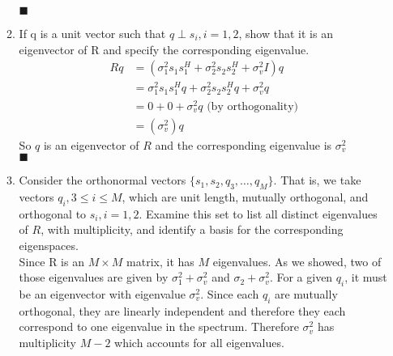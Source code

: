 \documentclass[12pt]{article}
\begin{document}
\begin{enumerate}
\begin{enumerate}
$\blacksquare$
\item If q is a unit vector such that $q \perp s_i, i=1,2$, show that it is an eigenvector of R and specify the corresponding eigenvalue.
\begin{align*}
Rq &= (\sigma_1^2s_1s_1^H + \sigma_2^2s_2s_2^H + \sigma_v^2 I)q\\
&= \sigma_1^2s_1s_1^Hq + \sigma_2^2s_2s_2^Hq + \sigma_v^2 q\\
&= 0 + 0 + \sigma_v^2 q \text{ (by orthogonality)}\\
&= (\sigma_v^2)q
\end{align*}
So $q$ is an eigenvector of $R$ and the corresponding eigenvalue is $\sigma_v^2$\\
$\blacksquare$
\item Consider the orthonormal vectors $\{s_1,s_2,q_3,\hdots,q_M\}$.  That is, we take vectors $q_i, 3\leq i \leq M$, which are unit length, mutually orthogonal, and orthogonal to $s_i,i=1,2$.  Examine this set to list all distinct eigenvalues of $R$, with multiplicity, and identify a basis for the corresponding eigenspaces.\\

Since R is an $M\times M$ matrix, it has $M$ eigenvalues.  As we showed, two of those eigenvalues are given by $\sigma_1^2 + \sigma_v^2$ and $\sigma_2+\sigma_v^2$.  For a given $q_i$, it must be an eigenvector with eigenvalue $\sigma_v^2$.  Since each $q_i$ are mutually orthogonal, they are linearly independent and therefore they each correspond to one eigenvalue in the spectrum.  Therefore $\sigma_v^2$ has multiplicity $M-2$ which accounts for all eigenvalues.
\end{enumerate}
\end{enumerate}
\end{document}
